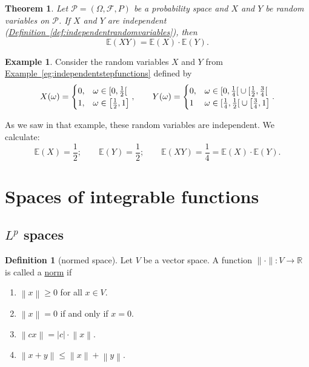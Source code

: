 \documentclass[a4paper,12pt]{scrreprt}
\newcommand{\R}{\mathbb{R}}
\newcommand{\E}{\mathbb{E}}
\newcommand{\defn}[1]{\ul{#1}}
\newcommand{\norm}[1]{\left\|#1\right\|}
\theoremstyle{definition}
\newtheorem{definition}{Definition}[section]
\newtheorem{example}{Example}[section]
\theoremstyle{plain}
\newtheorem{theorem}{Theorem}[section]
\theoremstyle{remark}
\begin{document}
\begin{theorem}
  Let $\mathcal{P} = (\Omega, \mathcal{F}, P)$ be a probability space and $X$ and $Y$ be random variables on $\mathcal{P}$. If $X$ and $Y$ are independent (\hyperref[def:independentrandomvariables]{Definition~\ref*{def:independentrandomvariables}}), then
  \begin{equation*}
    \mathbb{E}(XY) = \mathbb{E}(X) \cdot \mathbb{E}(Y).
  \end{equation*}
\end{theorem}

\begin{example}
  Consider the random variables $X$ and $Y$ from \hyperref[eg:independentstepfunctions]{Example~\ref*{eg:independentstepfunctions}} defined by
  \begin{equation*}
    X(\omega) =
    \begin{cases}
      0, &\omega \in \interval[open right]{0}{\frac{1}{2}} \\
      1, &\omega \in \left[ \frac{1}{2}, 1 \right]
    \end{cases},
    \qquad
    Y(\omega) =
    \begin{cases}
      0, & \omega \in \interval[open right]{0}{\frac{1}{4}} \cup \interval[open right]{\frac{1}{2}}{\frac{3}{4}} \\
      1 & \omega \in \interval[open right]{\frac{1}{4}}{\frac{1}{2}} \cup \left[ \frac{3}{4}, 1 \right]
    \end{cases}.
  \end{equation*}

  As we saw in that example, these random variables are independent. We calculate:
  \begin{equation*}
    \E(X) = \frac{1}{2};\qquad \E(Y) = \frac{1}{2};\qquad \E(XY) = \frac{1}{4} = \E(X)\cdot \E(Y).
  \end{equation*}
\end{example}

\section{Spaces of integrable functions}
\subsection{\texorpdfstring{$L^{p}$}{Lg} spaces}
\begin{definition}[normed space]
  \label{def:normedspace}
  Let $V$ be a vector space. A function $\|\cdot\|\colon V \to \R$ is called a \defn{norm} if
  \begin{enumerate}
    \item $\norm{x} \geq 0$ for all $x \in V$.

    \item $\norm{x} = 0$ if and only if $x = 0$.

    \item $\norm{cx} = \left|c\right|\cdot\norm{x}$.

    \item $\norm{x+y} \leq \norm{x} + \norm{y}$.
  \end{enumerate}
\end{definition}
\end{document}
